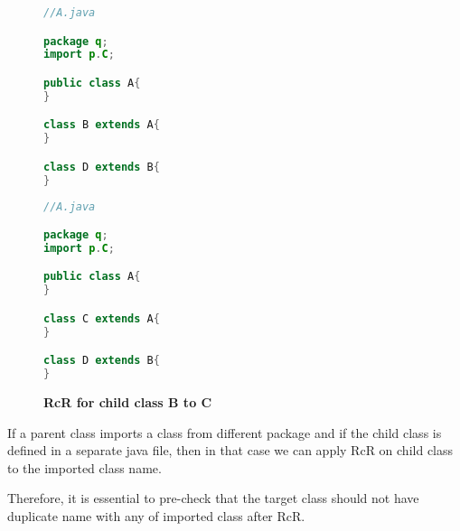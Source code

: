 \begin{figure}[th]
\centering
\begin{minipage}[t]{0.45\linewidth}
\begin{lstlisting}[language=java, basicstyle=\scriptsize\ttfamily,frame=single]	
//A.java

package q;
import p.C;

public class A{	
}

class B extends A{	
}

class D extends B{
}
\end{lstlisting}
\end{minipage}
\hfill
\begin{minipage}[t]{0.45\linewidth}
\begin{lstlisting}[language=java, basicstyle=\scriptsize\ttfamily,frame=single]
//A.java

package q;
import p.C;

public class A{	
}

class C extends A{	
}

class D extends B{
}	
\end{lstlisting}
\end{minipage}
\caption{\textbf{RcR for child class B to C}}
\label{figure:figpc3_1}
\end{figure}


If a parent class imports a class from different package and if the child class is defined in a separate java file, then in that case we can apply RcR on child class to the imported class name.

Therefore, it is essential to pre-check that the target class should not have duplicate name with any of imported class after RcR.
